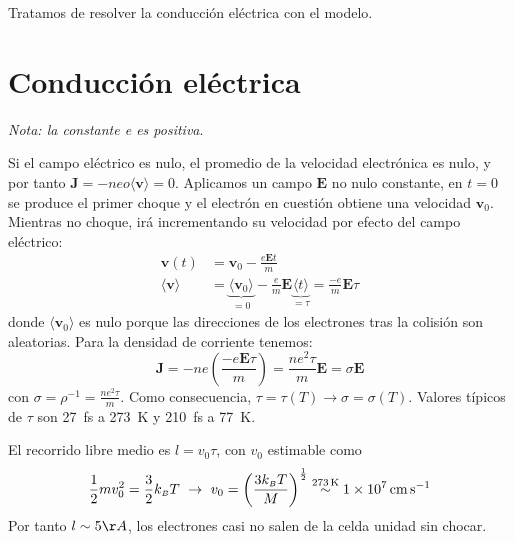Tratamos de resolver la conducción eléctrica con el modelo.
\section{Conducción eléctrica}
\emph{\small{Nota: la constante \emph{e} es positiva}}.


Si el campo eléctrico es nulo, el promedio de la velocidad electrónica
es nulo, y por tanto $\mathbf{J} = -neo\langle \mathbf{v}\rangle =
0$. Aplicamos un campo $\mathbf{E}$ no nulo constante, en $t=0$ se
produce el primer choque y el electrón en cuestión obtiene una
velocidad $\mathbf{v}_0$. Mientras no choque, irá incrementando su
velocidad por efecto del campo eléctrico:
\begin{equation}
\begin{split}
  \mathbf{v}(t) &= \mathbf{v}_0 - \frac{e \mathbf{E} t}{m} \\
  \langle \mathbf{v}\rangle &= \underbrace{\langle
                              \mathbf{v}_0\rangle}_{=0} - \frac{e}{m}
                              \mathbf{E} \underbrace{\langle t
                              \rangle}_{=\tau} = \frac{-e}{m} \mathbf{E}\tau
\end{split}
\end{equation}
donde $\langle \mathbf{v}_0\rangle$ es nulo porque las direcciones de
los electrones tras la colisión son aleatorias. Para la densidad de
corriente tenemos:
\begin{equation}
  \mathbf{J} = -ne \left( \frac{-e \mathbf{E}\tau}{m} \right) =
  \frac{n e^2 \tau}{m} \mathbf{E} = \sigma \mathbf{E} \tag{Ohm's law}
\end{equation}
con $\sigma = \rho^{-1} = \frac{n e^2 \tau}{m}$. Como consecuencia,
$\tau=\tau(T) \rightarrow \sigma = \sigma(T)$. Valores típicos de
$\tau$ son  \SI{27}{\femto\second} a \SI{273}{\kelvin}  y \SI{210}{\femto\second} a \SI{77}{\kelvin}.

El recorrido libre medio es $l = v_0 \tau$, con $v_0$ estimable como
\begin{equation}
  \frac{1}{2} m v_0^2 = \frac{3}{2} k_{\scriptscriptstyle{B}}  T \ \rightarrow \ v_0 = \left(
    \frac{3k_{\scriptscriptstyle{B}} T}{M} \right)^\frac{1}{2}
  \stackrel{\SI{273}{\kelvin}}{\sim} \SI{1e7}{\centi\metre\per\second}
\end{equation}
Por tanto $l \sim 5 \AA$, los electrones casi no salen de la celda
unidad sin chocar.

